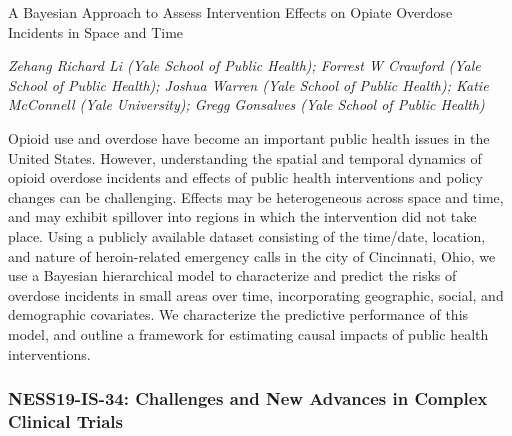 \begin{itemize}
A Bayesian Approach to Assess Intervention Effects on Opiate Overdose Incidents in Space and Time

\emph{\footnotesize Zehang Richard Li (Yale School of Public Health); Forrest W Crawford (Yale School of Public Health); Joshua Warren (Yale School of Public Health); Katie McConnell  (Yale University); Gregg Gonsalves  (Yale School of Public Health)}

Opioid use and overdose have become an important public health issues in the United States. However, understanding the spatial and temporal dynamics of opioid overdose incidents and effects of public health interventions and policy changes can be challenging. Effects may be heterogeneous across space and time, and may exhibit spillover into regions in which the intervention did not take place. Using a publicly available dataset consisting of the time/date, location, and nature of heroin-related emergency calls in the city of Cincinnati, Ohio, we use a Bayesian hierarchical model to characterize and predict the risks of overdose incidents in small areas over time, incorporating geographic, social, and demographic covariates. We characterize the predictive performance of this model, and outline a framework for estimating causal impacts of public health interventions.

\end{itemize}

\subsubsection*{NESS19-IS-34: Challenges and New Advances in Complex Clinical Trials}

